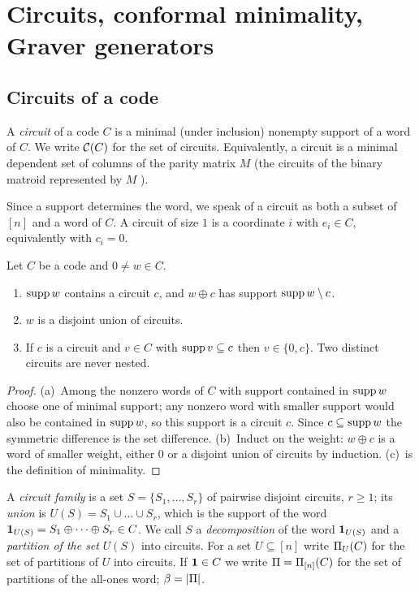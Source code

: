 \section{Circuits, conformal minimality, Graver generators}\label{sec:circuits}

\subsection{Circuits of a code}

\begin{definition}[Circuit]\label{def:circuit}
A \emph{circuit} of a code $C$ is a minimal (under inclusion) nonempty support of a word of $C$. We write $\mathcal C(C)$ for the set of circuits. Equivalently, a circuit is a minimal dependent set of columns of the parity matrix $M$ (the circuits of the binary matroid represented by $M$ \cite{Oxley2011}).
\end{definition}

Since a support determines the word, we speak of a circuit as both a subset of $[n]$ and a word of $C$. A circuit of size $1$ is a coordinate $i$ with $e_i\in C$, equivalently with $c_i=0$.

\begin{lemma}\label{lem:circuit-basic}
Let $C$ be a code and $0\ne w\in C$.
\begin{enumerate}[label=(\alph*)]
\item $\operatorname{supp} w$ contains a circuit $c$, and $w\oplus c$ has support $\operatorname{supp} w\setminus c$.
\item $w$ is a disjoint union of circuits.
\item If $c$ is a circuit and $v\in C$ with $\operatorname{supp} v\subseteq c$ then $v\in\{0,c\}$. Two distinct circuits are never nested.
\end{enumerate}
\end{lemma}

\begin{proof}
(a)~Among the nonzero words of $C$ with support contained in $\operatorname{supp} w$ choose one of minimal support; any nonzero word with smaller support would also be contained in $\operatorname{supp} w$, so this support is a circuit $c$. Since $c\subseteq\operatorname{supp} w$ the symmetric difference is the set difference. (b)~Induct on the weight: $w\oplus c$ is a word of smaller weight, either $0$ or a disjoint union of circuits by induction. (c)~is the definition of minimality.
\end{proof}

\begin{definition}\label{def:decomp}
A \emph{circuit family} is a set $S=\{S_1,\dots,S_r\}$ of pairwise disjoint circuits, $r\ge1$; its \emph{union} is $U(S)=S_1\cup\dots\cup S_r$, which is the support of the word $\mathbf 1_{U(S)}=S_1\oplus\dots\oplus S_r\in C$. We call $S$ a \emph{decomposition} of the word $\mathbf 1_{U(S)}$ and a \emph{partition of the set} $U(S)$ into circuits. For a set $U\subseteq[n]$ write $\Pi_U(C)$ for the set of partitions of $U$ into circuits. If $\mathbf 1\in C$ we write $\Pi=\Pi_{[n]}(C)$ for the set of partitions of the all-ones word; $\beta=|\Pi|$.
\end{definition}


